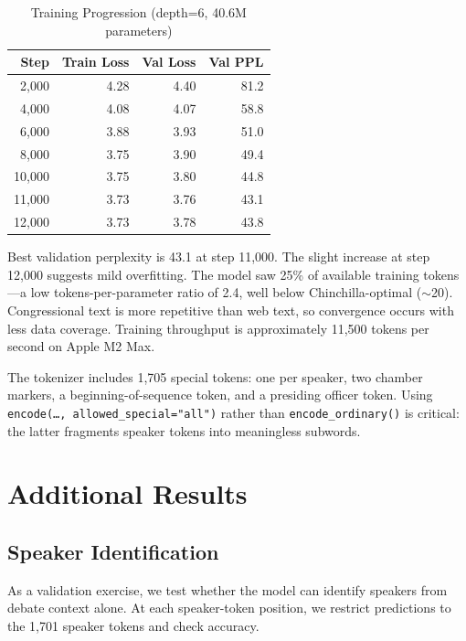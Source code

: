 \documentclass[12pt]{article}
\begin{document}
\begin{table}[H]
\centering
\caption{Training Progression (depth=6, 40.6M parameters)}
\label{tab:training}
\begin{tabular}{rrrr}
\toprule
Step & Train Loss & Val Loss & Val PPL \\
\midrule
2,000 & 4.28 & 4.40 & 81.2 \\
4,000 & 4.08 & 4.07 & 58.8 \\
6,000 & 3.88 & 3.93 & 51.0 \\
8,000 & 3.75 & 3.90 & 49.4 \\
10,000 & 3.75 & 3.80 & 44.8 \\
11,000 & 3.73 & 3.76 & 43.1 \\
12,000 & 3.73 & 3.78 & 43.8 \\
\bottomrule
\end{tabular}
\end{table}

Best validation perplexity is 43.1 at step 11,000. The slight increase at step 12,000 suggests mild overfitting. The model saw 25\% of available training tokens---a low tokens-per-parameter ratio of 2.4, well below Chinchilla-optimal ($\sim$20). Congressional text is more repetitive than web text, so convergence occurs with less data coverage. Training throughput is approximately 11,500 tokens per second on Apple M2 Max.

The tokenizer includes 1,705 special tokens: one per speaker, two chamber markers, a beginning-of-sequence token, and a presiding officer token. Using \texttt{encode(\ldots, allowed\_special="all")} rather than \texttt{encode\_ordinary()} is critical: the latter fragments speaker tokens into meaningless subwords.


\section{Additional Results}
\label{app:results}

\subsection{Speaker Identification}

As a validation exercise, we test whether the model can identify speakers from debate context alone. At each speaker-token position, we restrict predictions to the 1,701 speaker tokens and check accuracy.
\end{document}
